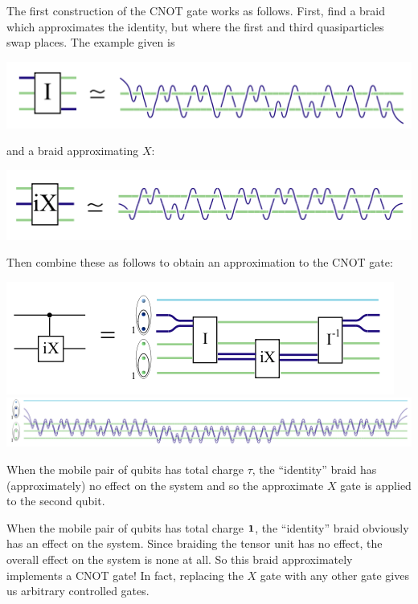The first construction of the CNOT gate works as follows. First, find a braid
which approximates the identity, but where the first and third quasiparticles
swap places. The example given is

\begin{center}
\includegraphics{I-small.png}
\end{center}

and a braid approximating $X$:


\begin{center}
\includegraphics{X-small.png}
\end{center}

Then combine these as follows to obtain an approximation to the CNOT gate:

\begin{center}
\includegraphics{CNOT-small.png} \\
\includegraphics{CNOT-large.png}
\end{center}

When the mobile pair of qubits has total charge $\tau$, the ``identity'' braid
has (approximately) no effect on the system and so the approximate $X$ gate is
applied to the second qubit.

When the mobile pair of qubits has total charge $\mathbf{1}$, the ``identity'' braid
obviously has an effect on the system. Since braiding the tensor unit has no
effect, the overall effect on the system is none at all. So this braid
approximately implements a CNOT gate! In fact, replacing the $X$ gate with any
other gate gives us arbitrary controlled gates.

